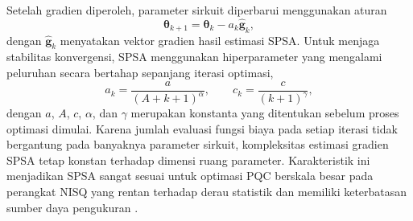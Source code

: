 Setelah gradien diperoleh, parameter sirkuit diperbarui menggunakan aturan
\begin{equation}
\boldsymbol{\theta}_{k+1}
=
\boldsymbol{\theta}_k
-
a_k \hat{\mathbf g}_k,
\end{equation}
dengan $\hat{\mathbf g}_k$ menyatakan vektor gradien hasil estimasi SPSA. Untuk menjaga stabilitas konvergensi, SPSA menggunakan hiperparameter yang mengalami peluruhan secara bertahap sepanjang iterasi optimasi,
\begin{equation}
a_k
=
\frac{a}{(A+k+1)^\alpha},
\qquad
c_k
=
\frac{c}{(k+1)^\gamma},
\label{eq:spsa_decay}
\end{equation}
dengan $a$, $A$, $c$, $\alpha$, dan $\gamma$ merupakan konstanta yang ditentukan sebelum proses optimasi dimulai. Karena jumlah evaluasi fungsi biaya pada setiap iterasi tidak bergantung pada banyaknya parameter sirkuit, kompleksitas estimasi gradien SPSA tetap konstan terhadap dimensi ruang parameter. Karakteristik ini menjadikan SPSA sangat sesuai untuk optimasi PQC berskala besar pada perangkat NISQ yang rentan terhadap derau statistik dan memiliki keterbatasan sumber daya pengukuran \cite{spall_implementation_1998}.
